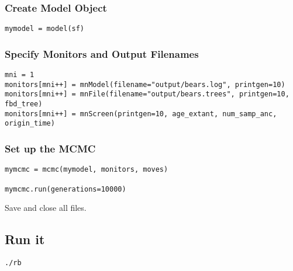 \medskip
\subsubsection{Create Model Object}


{\tt \begin{snugshade*}
\begin{lstlisting}
mymodel = model(sf)
\end{lstlisting}
\end{snugshade*}}

\medskip
\subsubsection{Specify Monitors and Output Filenames}


{\tt \begin{snugshade*}
\begin{lstlisting}
mni = 1
monitors[mni++] = mnModel(filename="output/bears.log", printgen=10)
monitors[mni++] = mnFile(filename="output/bears.trees", printgen=10, fbd_tree)
monitors[mni++] = mnScreen(printgen=10, age_extant, num_samp_anc, origin_time)
\end{lstlisting}
\end{snugshade*}}

\medskip
\subsubsection{Set up the MCMC}


{\tt \begin{snugshade*}
\begin{lstlisting}
mymcmc = mcmc(mymodel, monitors, moves)

mymcmc.run(generations=10000)
\end{lstlisting}
\end{snugshade*}}

{\begin{framed}
Save and close all files.
\end{framed}}

\bigskip
\subsection{Run it}


{\tt \begin{snugshade*}
\begin{lstlisting}
./rb
\end{lstlisting}
\end{snugshade*}}

